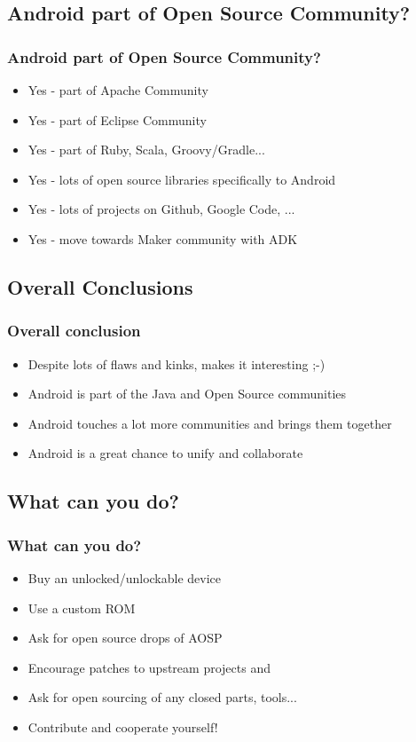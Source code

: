 \documentclass{beamer}
\begin{document}
  \subsection{Android part of Open Source Community?}
    \begin{frame}
     \frametitle{Android part of Open Source Community?}
     \begin{itemize}
      \item<1-> Yes - part of Apache Community
      \item<2-> Yes - part of Eclipse Community
      \item<3-> Yes - part of Ruby, Scala, Groovy/Gradle...
      \item<4-> Yes - lots of open source libraries specifically to Android
      \item<5-> Yes - lots of projects on Github, Google Code, ...
      \item<6-> Yes - move towards Maker community with ADK
     \end{itemize}
    \end{frame}

  \subsection{Overall Conclusions}
    \begin{frame}
      \frametitle {Overall conclusion}
      \begin{itemize}
        \item<1-> Despite lots of flaws and kinks, makes it interesting ;-)
        \item<2-> Android is part of the Java and Open Source communities
        \item<3-> Android touches a lot more communities and brings them together
        \item<4-> Android is a great chance to unify and collaborate 
      \end{itemize}
    \end{frame}

  \subsection{What can you do?}
    \begin{frame}
      \frametitle{What can you do?}
      \begin{itemize}
        \item<1-> Buy an unlocked/unlockable device
        \item<2-> Use a custom ROM
        \item<3-> Ask for open source drops of AOSP 
        \item<4-> Encourage patches to upstream projects and 
        \item<5-> Ask for open sourcing of any closed parts, tools...
        \item<6-> Contribute and cooperate yourself! 
      \end{itemize}
    \end{frame}
\end{document}
